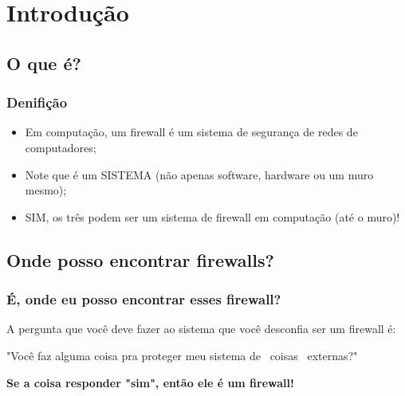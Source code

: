 \section{Introdução} 

\subsection{O que é?} %

\begin{frame}
	\frametitle{Denifição}

	\begin{itemize}
		\item Em computação, um firewall é um sistema de segurança de redes de computadores;
		\item Note que é um SISTEMA (não apenas software, hardware ou um muro mesmo);
		\item SIM, os três podem ser um sistema de firewall em computação (até o muro)!
	\end{itemize}

\end{frame}


\newcommand{\ondefire}[3]{
	\begin{frame}
		\frametitle{#1}
		\begin{figure}
			\centering
			\texttt{[image: imagens/\#3]}
			\caption{#2}
		\end{figure}
	\end{frame}
}

\subsection{Onde posso encontrar firewalls?}

\begin{frame}

	\frametitle{É, onde eu posso encontrar esses firewall?}

	\begin{block}{A pergunta que você deve fazer ao sistema que você desconfia ser um firewall é:}

	"Você faz alguma coisa pra proteger meu sistema de ~coisas~ externas?"

	\end{block}


	\textbf{Se a coisa responder "sim", então ele é um firewall!}

\end{frame}

